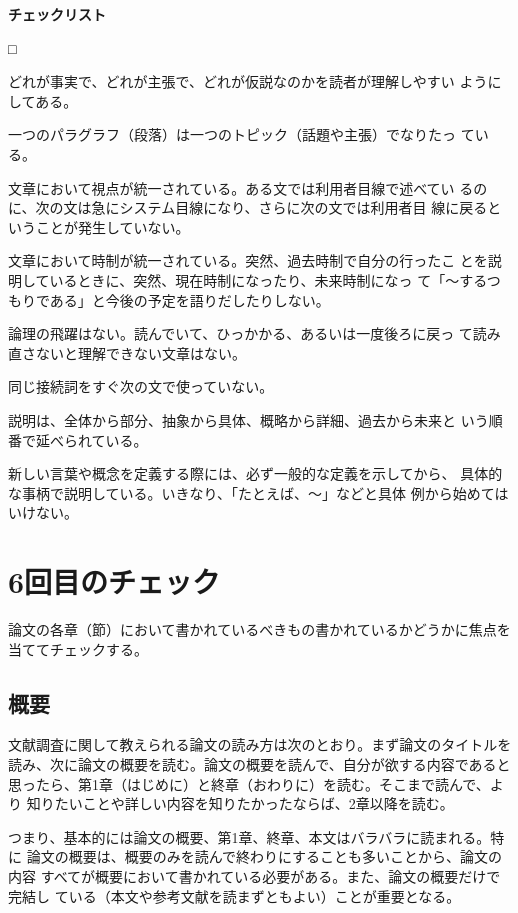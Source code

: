 \documentclass[11pt,a4j]{jsarticle}
\begin{document}
\begin{flushleft}
 {\bf チェックリスト}
\end{flushleft}
\begin{list}%
 {□} %
 {} %
 \item どれが事実で、どれが主張で、どれが仮説なのかを読者が理解しやすい
       ようにしてある。
 \item 一つのパラグラフ（段落）は一つのトピック（話題や主張）でなりたっ
       ている。
 \item 文章において視点が統一されている。ある文では利用者目線で述べてい
       るのに、次の文は急にシステム目線になり、さらに次の文では利用者目
       線に戻るということが発生していない。
 \item 文章において時制が統一されている。突然、過去時制で自分の行ったこ
       とを説明しているときに、突然、現在時制になったり、未来時制になっ
       て「〜するつもりである」と今後の予定を語りだしたりしない。
 \item 論理の飛躍はない。読んでいて、ひっかかる、あるいは一度後ろに戻っ
       て読み直さないと理解できない文章はない。
 \item 同じ接続詞をすぐ次の文で使っていない。
 \item 説明は、全体から部分、抽象から具体、概略から詳細、過去から未来と
       いう順番で延べられている。
 \item 新しい言葉や概念を定義する際には、必ず一般的な定義を示してから、
       具体的な事柄で説明している。いきなり、「たとえば、〜」などと具体
       例から始めてはいけない。
\end{list}

\section{6回目のチェック}

論文の各章（節）において書かれているべきもの書かれているかどうかに焦点を
当ててチェックする。

\subsection{概要}

文献調査に関して教えられる論文の読み方は次のとおり。まず論文のタイトルを
読み、次に論文の概要を読む。論文の概要を読んで、自分が欲する内容であると
思ったら、第1章（はじめに）と終章（おわりに）を読む。そこまで読んで、より
知りたいことや詳しい内容を知りたかったならば、2章以降を読む。

つまり、基本的には論文の概要、第1章、終章、本文はバラバラに読まれる。特に
論文の概要は、概要のみを読んで終わりにすることも多いことから、論文の内容
すべてが概要において書かれている必要がある。また、論文の概要だけで完結し
ている（本文や参考文献を読まずともよい）ことが重要となる。
\end{document}
